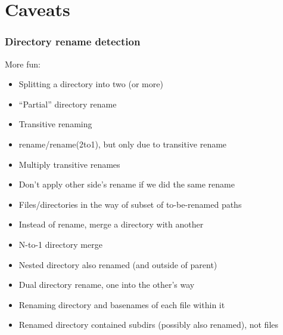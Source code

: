 \documentclass[t]{beamer}
\begin{document}
\section{Caveats}
\begin{frame}
  \frametitle{Directory rename detection}

  More fun:
  \begin{itemize}[<+->]
    \item Splitting a directory into two (or more)
    \item ``Partial'' directory rename

    \item Transitive renaming
    \item rename/rename(2to1), but only due to transitive rename
    \item Multiply transitive renames

    \item Don't apply other side's rename if we did the same rename

    \item Files/directories in the way of subset of to-be-renamed paths

    \item Instead of rename, merge a directory with another
    \item N-to-1 directory merge

    \item Nested directory also renamed (and outside of parent)
    \item Dual directory rename, one into the other's way
    \item Renaming directory and basenames of each file within it
    \item Renamed directory contained subdirs (possibly also renamed), not files

  \end{itemize}

\end{frame}
\end{document}
